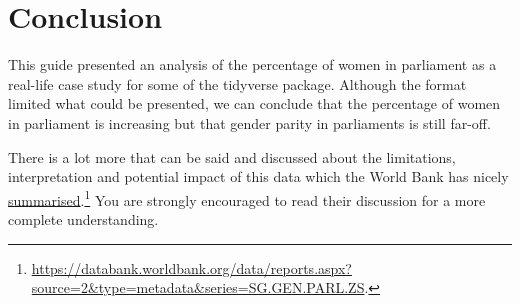 \documentclass[a4paper,9pt,twocolumn,twoside,printwatermark=false]{pinp}
\begin{document}
\hypertarget{conclusion}{%
\section{Conclusion}\label{conclusion}}

This guide presented an analysis of the percentage of women in
parliament as a real-life case study for some of the tidyverse package.
Although the format limited what could be presented, we can conclude
that the percentage of women in parliament is increasing but that gender
parity in parliaments is still far-off.

There is a lot more that can be said and discussed about the
limitations, interpretation and potential impact of this data which the
World Bank has nicely
\href{https://databank.worldbank.org/data/reports.aspx?source=2\&type=metadata\&series=SG.GEN.PARL.ZS\#}{summarised}.\footnote{\url{https://databank.worldbank.org/data/reports.aspx?source=2\&type=metadata\&series=SG.GEN.PARL.ZS}.}
You are strongly encouraged to read their discussion for a more complete
understanding.





\end{document}
